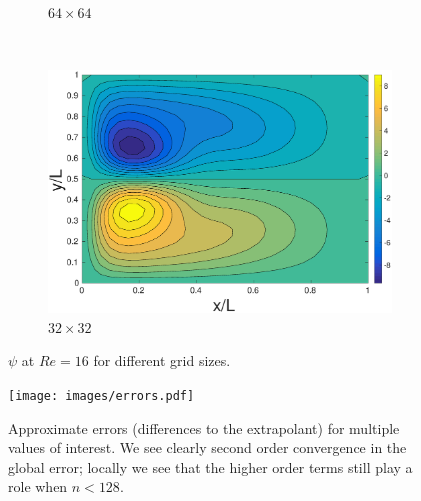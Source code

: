 \begin{figure}[h]
{\begin{subfigure}[b]{0.5\textwidth}
        \caption{$64\times 64$}
        \label{fig:nm64}
    \end{subfigure}
    ~
    \begin{subfigure}[b]{0.5\textwidth}
        \includegraphics[width=\textwidth]{images/grid32.eps}
        \caption{$32\times 32$}
        \label{fig:nm32}
    \end{subfigure}
    }
    \caption{$\psi$ at $Re = 16$ for different grid sizes.}\label{fig:grids}
    
\end{figure}

\begin{figure}
	\centerline{\texttt{[image: images/errors.pdf]}}
	\caption{Approximate errors (differences to the extrapolant) for multiple values of interest. We see clearly second order convergence in the global error; locally we see that the higher order terms still play a role when $n < 128.$}
	\label{fig:errors}
\end{figure}

